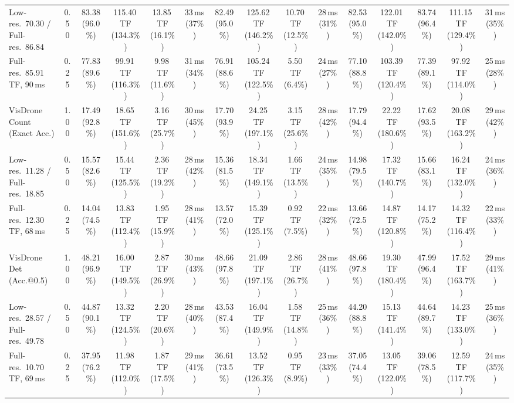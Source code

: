 \begin{table}[t]
{\begin{tabular}{l c | c c c c | c c c c | c c | c c c}
{\footnotesize Low-res.\ 70.30 / Full-res.\ 86.84} & 0.50 & 83.38 (96.0\%) & 115.40\,TF (134.3\%) & 13.85\,TF (16.1\%) & 33\,ms (37\%) & 82.49 (95.0\%) & 125.62\,TF (146.2\%) & 10.70\,TF (12.5\%) & 28\,ms (31\%) & 82.53 (95.0\%) & 122.01\,TF (142.0\%) & 83.74 (96.4\%) & 111.15\,TF (129.4\%) & 31\,ms (35\%) \\
{\footnotesize Full-res.\ 85.91\,TF, 90\,ms} & 0.25 & 77.83 (89.6\%) & 99.91\,TF (116.3\%) & 9.98\,TF (11.6\%) & 31\,ms (34\%) & 76.91 (88.6\%) & 105.24\,TF (122.5\%) & 5.50\,TF (6.4\%) & 24\,ms (27\%) & 77.10 (88.8\%) & 103.39\,TF (120.4\%) & 77.39 (89.1\%) & 97.92\,TF (114.0\%) & 25\,ms (28\%) \\
\cmidrule(lr){1-15}
VisDrone Count (Exact Acc.) & 1.00 & 17.49 (92.8\%) & 18.65\,TF (151.6\%) & 3.16\,TF (25.7\%) & 30\,ms (45\%) & 17.70 (93.9\%) & 24.25\,TF (197.1\%) & 3.15\,TF (25.6\%) & 28\,ms (42\%) & 17.79 (94.4\%) & 22.22\,TF (180.6\%) & 17.62 (93.5\%) & 20.08\,TF (163.2\%) & 29\,ms (42\%) \\
{\footnotesize Low-res.\ 11.28 / Full-res.\ 18.85} & 0.50 & 15.57 (82.6\%) & 15.44\,TF (125.5\%) & 2.36\,TF (19.2\%) & 28\,ms (42\%) & 15.36 (81.5\%) & 18.34\,TF (149.1\%) & 1.66\,TF (13.5\%) & 24\,ms (35\%) & 14.98 (79.5\%) & 17.32\,TF (140.7\%) & 15.66 (83.1\%) & 16.24\,TF (132.0\%) & 24\,ms (36\%) \\
{\footnotesize Full-res.\ 12.30\,TF, 68\,ms} & 0.25 & 14.04 (74.5\%) & 13.83\,TF (112.4\%) & 1.95\,TF (15.9\%) & 28\,ms (41\%) & 13.57 (72.0\%) & 15.39\,TF (125.1\%) & 0.92\,TF (7.5\%) & 22\,ms (32\%) & 13.66 (72.5\%) & 14.87\,TF (120.8\%) & 14.17 (75.2\%) & 14.32\,TF (116.4\%) & 22\,ms (33\%) \\
\cmidrule(lr){1-15}
VisDrone Det (Acc.@0.5) & 1.00 & 48.21 (96.9\%) & 16.00\,TF (149.5\%) & 2.87\,TF (26.9\%) & 30\,ms (43\%) & 48.66 (97.8\%) & 21.09\,TF (197.1\%) & 2.86\,TF (26.7\%) & 28\,ms (41\%) & 48.66 (97.8\%) & 19.30\,TF (180.4\%) & 47.99 (96.4\%) & 17.52\,TF (163.7\%) & 29\,ms (41\%) \\
{\footnotesize Low-res.\ 28.57 / Full-res.\ 49.78} & 0.50 & 44.87 (90.1\%) & 13.32\,TF (124.5\%) & 2.20\,TF (20.6\%) & 28\,ms (40\%) & 43.53 (87.4\%) & 16.04\,TF (149.9\%) & 1.58\,TF (14.8\%) & 25\,ms (36\%) & 44.20 (88.8\%) & 15.13\,TF (141.4\%) & 44.64 (89.7\%) & 14.23\,TF (133.0\%) & 25\,ms (36\%) \\
{\footnotesize Full-res.\ 10.70\,TF, 69\,ms} & 0.25 & 37.95 (76.2\%) & 11.98\,TF (112.0\%) & 1.87\,TF (17.5\%) & 29\,ms (41\%) & 36.61 (73.5\%) & 13.52\,TF (126.3\%) & 0.95\,TF (8.9\%) & 23\,ms (33\%) & 37.05 (74.4\%) & 13.05\,TF (122.0\%) & 39.06 (78.5\%) & 12.59\,TF (117.7\%) & 24\,ms (35\%) \\

\end{tabular}}
\end{table}
